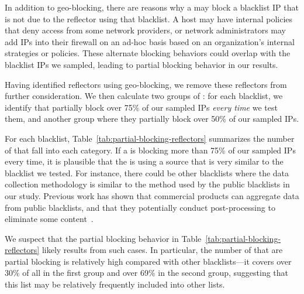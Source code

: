 

In addition to geo-blocking, there are reasons why a {} may
block a blacklist IP that is not due to the reflector using that
blacklist.  A host may have internal policies that deny access from
some network providers, or network administrators may add IPs into
their firewall on an ad-hoc basis based on an organization's internal
strategies or policies.  These alternate blocking behaviors could
overlap with the blacklist IPs we sampled, leading to partial blocking
behavior in our results.


Having identified reflectors using geo-blocking, we remove these
reflectors from further consideration.  We then calculate two groups of
{}: for each blacklist, we identify {} that
partially block over 75\% of our sampled IPs \textit{every time} we
test them, and another group where they partially block over 50\% of
our sampled IPs.


For each blacklist, Table~\ref{tab:partial-blocking-reflectors}
summarizes the number of {} that fall into each category.
If a {} is blocking more than 75\% of our sampled IPs every
time, it is plausible that the {} is using a source that is
very similar to the blacklist we tested.  For instance, there could be
other blacklists where the data collection methodology is similar to
the method used by the public blacklists in our study.  Previous work
has shown that commercial products can aggregate data from public
blacklists, and that they potentially conduct post-processing to
eliminate some content~\cite{li2019reading}.

We suspect that the partial blocking behavior in
Table~\ref{tab:partial-blocking-reflectors} likely results from such
cases.  In particular, the number of {} that are partial
blocking {\dshieldtop} is relatively high compared with other
blacklists---it covers over 30\% of all {} in the first
group and over 69\% in the second group, suggesting that this list may
be relatively frequently included into other lists.

